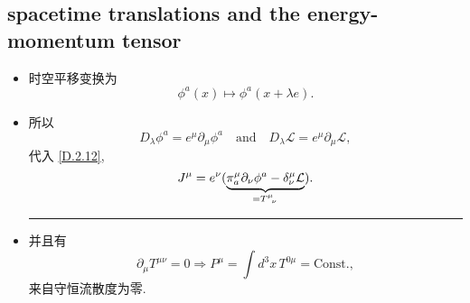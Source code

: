 \subsection{spacetime translations and the energy-momentum tensor} \label{D.2.3}
\begin{itemize}
	\item 时空平移变换为
	\begin{equation}
		\phi^a(x) \mapsto \phi^a(x + \lambda e).
	\end{equation}
	
	\item 所以
	\begin{equation}
		D_\lambda \phi^a = e^\mu \partial_\mu \phi^a \quad \text{and} \quad D_\lambda \mathcal{L} = e^\mu \partial_\mu \mathcal{L},
	\end{equation}
	代入 \eqref{D.2.12},
	\begin{equation}
		J^\mu = e^\nu (\underbrace{\pi_a^\mu \partial_\nu \phi^a - \delta^\mu_\nu \mathcal{L}}_{= \tensor{T}{^\mu_\nu}}).
	\end{equation}
	
	\noindent\rule[0.5ex]{\linewidth}{0.5pt} %
	
	\item 并且有
	\begin{equation} \label{D.2.19}
		\partial_\mu T^{\mu \nu} = 0 \Longrightarrow P^\mu = \int d^3 x \, T^{0 \mu} = \text{Const.},
	\end{equation}
	来自守恒流散度为零.
\end{itemize}

